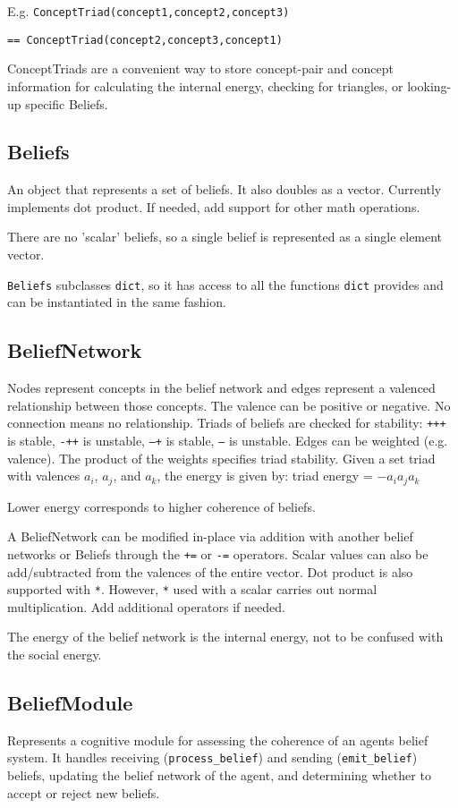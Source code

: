 \documentclass[11pt, a4paper]{article}
\begin{document}
E.g. \texttt{ConceptTriad(concept1,concept2,concept3)} 

\texttt{== ConceptTriad(concept2,concept3,concept1)}

ConceptTriads are a convenient way to store concept-pair and concept information for calculating the internal energy, checking for triangles, or looking-up specific Beliefs.

\subsection{Beliefs}

An object that represents a set of beliefs. It also doubles as a vector. Currently implements dot product. If needed, add support for other math operations.

There are no 'scalar' beliefs, so a single belief is represented as a single element vector.

\texttt{Beliefs} subclasses \texttt{dict}, so it has access to all the functions \texttt{dict} provides and can be instantiated in the same fashion.

\subsection{BeliefNetwork}
Nodes represent concepts in the belief network and edges represent a valenced relationship between those concepts. The valence can be positive or negative. No connection means no relationship. Triads of beliefs are checked for stability:
\texttt{+++} is stable,
\texttt{-++} is unstable,
\texttt{--+} is stable,
\texttt{---} is unstable.
Edges can be weighted (e.g. valence). The product of the weights specifies triad stability. Given a set triad with valences $a_i$, $a_j$, and $a_k$, the energy is given by: triad energy = $- a_i  a_j  a_k$

Lower energy corresponds to higher coherence of beliefs.

A BeliefNetwork can be modified in-place via addition with another belief networks or Beliefs through the \texttt{+=} or \texttt{-=} operators. Scalar values can also be add/subtracted from the valences of the entire vector. Dot product is also supported with \texttt{*}. However, \texttt{*} used with a scalar carries out normal multiplication. Add additional operators if needed.

The energy of the belief network is the internal energy, not to be confused with the social energy.

\subsection{BeliefModule}
Represents a cognitive module for assessing the coherence of an agents belief system. It handles receiving (\texttt{process\_belief}) and sending (\texttt{emit\_belief}) beliefs, updating the belief network of the agent, and determining whether to  accept or reject new beliefs.
\end{document}
